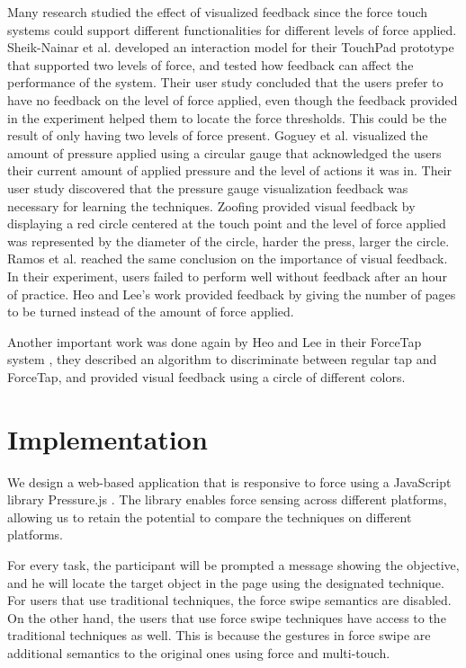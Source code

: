 \documentclass{sigchi}
\begin{document}
Many research studied the effect of visualized feedback since the force touch systems could support different functionalities for different levels of force applied. Sheik-Nainar et al. \cite{sheik2013two} developed an interaction model for their TouchPad prototype that supported two levels of force, and tested how feedback can affect the performance of the system. Their user study concluded that the users prefer to have no feedback on the level of force applied, even though the feedback provided in the experiment helped them to locate the force thresholds. This could be the result of only having two levels of force present. Goguey et al. \cite{goguey2018improving} visualized the amount of pressure applied using a circular gauge that acknowledged the users their current amount of applied pressure and the level of actions it was in. Their user study discovered that the pressure gauge visualization feedback was necessary for learning the techniques. Zoofing \cite{quinn2009zoofing} provided visual feedback by displaying a red circle centered at the touch point and the level of force applied was represented by the diameter of the circle, harder the press, larger the circle. Ramos et al. \cite{ramos2004pressure} reached the same conclusion on the importance of visual feedback. In their experiment, users failed to perform well without feedback after an hour of practice. Heo and Lee's work \cite{heo2011force} provided feedback by giving the number of pages to be turned instead of the amount of force applied. 

Another important work was done again by Heo and Lee in their ForceTap system \cite{heo2011forcetap}, they described an algorithm to discriminate between regular tap and ForceTap, and provided visual feedback using a circle of different colors.    

\section{Implementation} 

We design a web-based application that is responsive to force using a JavaScript library Pressure.js \cite{pressurejs}. The library enables force sensing across different platforms, allowing us to retain the potential to compare the techniques on different platforms. 

For every task, the participant will be prompted a message showing the objective, and he will locate the target object in the page using the designated technique. For users that use traditional techniques, the force swipe semantics are disabled. On the other hand, the users that use force swipe techniques have access to the traditional techniques as well. This is because the gestures in force swipe are additional semantics to the original ones using force and multi-touch.
\end{document}
